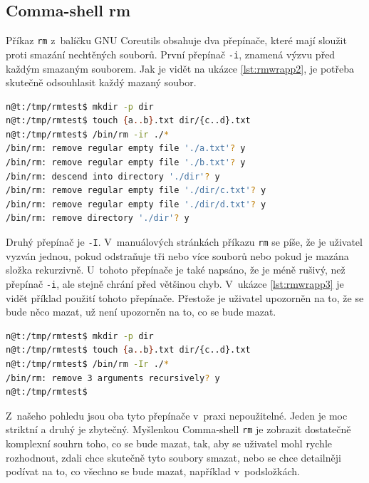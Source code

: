 \documentclass[thesis=M,czech]{FITthesis}[2012/06/26]
\begin{document}
%
\subsection{Comma-shell rm}

Příkaz \texttt{rm} z~balíčku GNU Coreutils obsahuje dva přepínače, které mají sloužit proti smazání nechtěných souborů. První přepínač \texttt{-i}, znamená výzvu před každým smazaným souborem. Jak je vidět na ukázce \ref{lst:rmwrapp2}, je potřeba skutečně odsouhlasit každý mazaný soubor.

\noindent
\begin{minipage}{\linewidth}
\begin{lstlisting}[language=bash, caption={rm}, label={lst:rmwrapp2}]
n@t:/tmp/rmtest$ mkdir -p dir
n@t:/tmp/rmtest$ touch {a..b}.txt dir/{c..d}.txt
n@t:/tmp/rmtest$ /bin/rm -ir ./*
/bin/rm: remove regular empty file './a.txt'? y
/bin/rm: remove regular empty file './b.txt'? y
/bin/rm: descend into directory './dir'? y
/bin/rm: remove regular empty file './dir/c.txt'? y
/bin/rm: remove regular empty file './dir/d.txt'? y
/bin/rm: remove directory './dir'? y
\end{lstlisting}
\end{minipage}

Druhý přepínač je \texttt{-I}. V~manuálových stránkách příkazu \texttt{rm} se píše, že je uživatel vyzván jednou, pokud odstraňuje tři nebo více souborů nebo pokud je mazána složka rekurzivně. U~tohoto přepínače je také napsáno, že je méně rušivý, než přepínač \texttt{-i}, ale stejně chrání před většinou chyb. V~ukázce \ref{lst:rmwrapp3} je vidět příklad použití tohoto přepínače. Přestože je uživatel upozorněn na to, že se bude něco mazat, už není upozorněn na to, co se bude mazat.

\noindent
\begin{minipage}{\linewidth}
\begin{lstlisting}[language=bash, caption={rm s~}, label={lst:rmwrapp3}]
n@t:/tmp/rmtest$ mkdir -p dir
n@t:/tmp/rmtest$ touch {a..b}.txt dir/{c..d}.txt
n@t:/tmp/rmtest$ /bin/rm -Ir ./*
/bin/rm: remove 3 arguments recursively? y
n@t:/tmp/rmtest$
\end{lstlisting}
\end{minipage}

Z~našeho pohledu jsou oba tyto přepínače v~praxi nepoužitelné. Jeden je moc striktní a druhý je zbytečný. Myšlenkou Comma-shell \texttt{rm} je zobrazit dostatečně komplexní souhrn toho, co se bude mazat, tak, aby se uživatel mohl rychle rozhodnout, zdali chce skutečně tyto soubory smazat, nebo se chce detailněji podívat na to, co všechno se bude mazat, například v~podsložkách.
\end{document}
